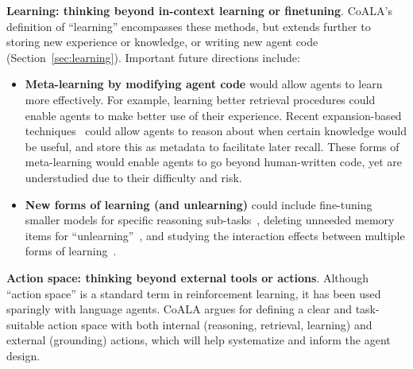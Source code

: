 \documentclass[10pt]{article} %
\begin{document}
\textbf{Learning: thinking beyond in-context learning or finetuning}. CoALA's definition of ``learning'' encompasses these methods, but extends further to storing new experience or knowledge, or writing new agent code (Section~\ref{sec:learning}). Important future directions include:
\begin{itemize}
    \item \textbf{Meta-learning by modifying agent code} would allow agents to learn more effectively. For example, learning better retrieval procedures could enable agents to make better use of their experience. Recent expansion-based techniques~\citep{nogueira2019document, wang2023query2doc, tang2023referral} could allow agents to reason about when certain knowledge would be useful, and store this as metadata to facilitate later recall. These forms of meta-learning would enable agents to go beyond human-written code, yet are understudied due to their difficulty and risk. 
    \item \textbf{New forms of learning (and unlearning)} could include fine-tuning smaller models for specific reasoning sub-tasks~\citep{zelikman2022star, huang2022large, ahn2022can}, deleting unneeded memory items for ``unlearning''~\citep{nguyen2022survey}, and studying the interaction effects between multiple forms of learning~\citep{tuyls2022multi, park2023generative, xie2023olagpt, khattab2022demonstrate}. 
    
\end{itemize}

\textbf{Action space: thinking beyond external tools or actions}. Although ``action space'' is a standard term in reinforcement learning, it has been used sparingly with language agents.
CoALA argues for defining a clear and task-suitable action space with both internal (reasoning, retrieval, learning) and external (grounding) actions, which will help systematize and inform the agent design.
\end{document}
